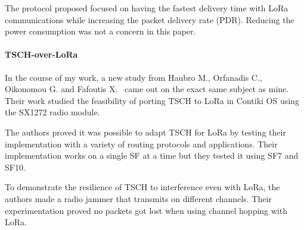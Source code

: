 The protocol proposed focused on having the fastest delivery time with LoRa
communications while increasing the packet delivery rate (PDR).
Reducing the power consumption was not a concern in this paper.


\paragraph{TSCH-over-LoRa}

In the course of my work, a new study from Haubro M., Orfanadis C.,
Oikonomou G. and Fafoutis X.~\cite{tschoverlora} came out on the exact 
same subject as mine. 
Their work studied the feasibility of porting TSCH to LoRa in Contiki OS using
the SX1272 radio module.

The authors proved it was possible to adapt TSCH for LoRa by testing their
implementation with a variety of routing protocols and applications.
Their implementation works on a single SF at a time but they tested it using
SF7 and SF10.

To demonstrate the resilience of TSCH to interference even with LoRa, the
authors made a radio jammer that transmits on different channels. Their
experimentation proved no packets got lost when using channel hopping with
LoRa.
